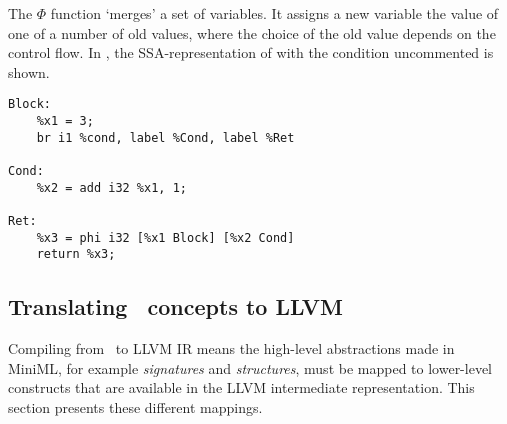 \begin{description}
The $\Phi$ function `merges' a set of variables.
It assigns a new variable the value of one of a number of old values, where the choice of the old value depends on the control flow.
In , the SSA-representation of  with the condition uncommented is shown.

\begin{lstlisting}[label=lst:ssaphi, caption={[SSA Representation 2]Code in SSA form with function.}, frame=single, language={[x86masm]Assembler}]
Block:
    %x1 = 3;
    br i1 %cond, label %Cond, label %Ret

Cond:
    %x2 = add i32 %x1, 1;
    
Ret:
    %x3 = phi i32 [%x1 Block] [%x2 Cond]
    return %x3;
\end{lstlisting}


\end{description}

\subsection{Translating \MiniML\ concepts to LLVM}
\label{sec:translation}
Compiling from \MiniML\ to LLVM IR means the high-level abstractions made in \mbox{MiniML}, for example \emph{signatures} and \emph{structures}, must be mapped to lower-level constructs that are available in the LLVM intermediate representation.
This section presents these different mappings.


